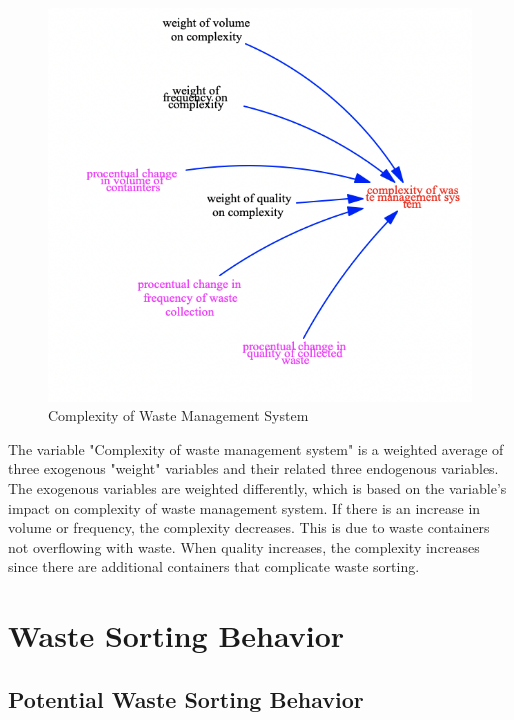 \begin{figure}[H]
\centering
\includegraphics [scale=0.34,angle=360]{figures/complexityeq.png}
\caption{Complexity of Waste Management System}
\label{fig:complexityeq}
\end{figure}

\indent \newline
The variable "Complexity of waste management system" is a weighted average of three exogenous "weight" variables and their related three endogenous variables. The exogenous variables are weighted differently, which is based on the variable's impact on complexity of waste management system. If there is an increase in volume or frequency, the complexity decreases. This is due to  waste containers not overflowing with waste. When quality increases, the complexity increases since there are additional containers that complicate waste sorting. 

\section{Waste Sorting Behavior}

\subsection{Potential Waste Sorting Behavior}

